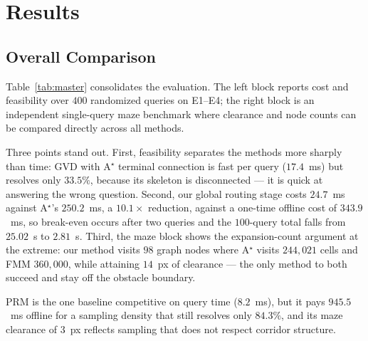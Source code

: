 \documentclass[conference]{IEEEtran}
\begin{document}
\section{Results}
\label{sec:results}

\subsection{Overall Comparison}

Table~\ref{tab:master} consolidates the evaluation. The left block reports cost and feasibility over $400$ randomized queries on E1--E4; the right block is an independent single-query maze benchmark where clearance and node counts can be compared directly across all methods.

Three points stand out. First, feasibility separates the methods more sharply than time: GVD with A$^\star$ terminal connection is fast per query ($17.4$~ms) but resolves only $33.5\%$, because its skeleton is disconnected --- it is quick at answering the wrong question. Second, our global routing stage costs $24.7$~ms against A$^\star$'s $250.2$~ms, a $10.1\times$ reduction, against a one-time offline cost of $343.9$~ms, so break-even occurs after two queries and the $100$-query total falls from $25.02$~s to $2.81$~s. Third, the maze block shows the expansion-count argument at the extreme: our method visits $98$ graph nodes where A$^\star$ visits $244{,}021$ cells and FMM $360{,}000$, while attaining $14$~px of clearance --- the only method to both succeed and stay off the obstacle boundary.

PRM is the one baseline competitive on query time ($8.2$~ms), but it pays $945.5$~ms offline for a sampling density that still resolves only $84.3\%$, and its maze clearance of $3$~px reflects sampling that does not respect corridor structure.
\end{document}
